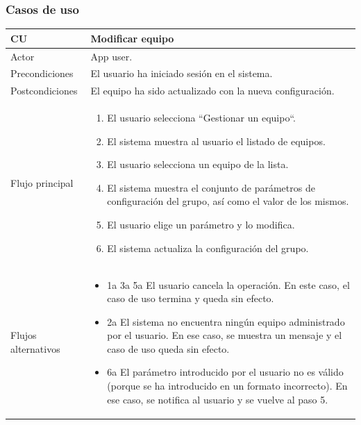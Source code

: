 \documentclass[twoside]{report}
\newcommand\addrow[2]{#1 &#2\\ }
\newcommand\addheading[2]{#1 &#2\\ \hline}
\newcommand\tabularhead{\begin{tabular}{lp{0.7\textwidth}}
\hline
}
\newenvironment{usecase}{\tabularhead}
{\hline\end{tabular}}
\begin{document}
\subsubsection{Casos de uso}



\begin{usecase}
  \addheading{\textbf{CU\arabic{usecase}}}{Modificar equipo} 
  \addrow{Actor}{App user.}
  \addrow{Precondiciones}{El usuario ha iniciado sesión en el sistema.}
  \addrow{Postcondiciones}{El equipo ha sido actualizado con la nueva configuración.}
  \addrow{Flujo principal}{
  		\begin{enumerate}
  		\item El usuario selecciona “Gestionar un equipo“. %
        \item El sistema muestra al usuario el listado de equipos. %
        \item El usuario selecciona un equipo de la lista. %
        \item El sistema muestra el conjunto de parámetros de configuración del grupo, así como el valor de los mismos. %
        \item El usuario elige un parámetro y lo modifica. %
        \item El sistema actualiza la configuración del grupo. %
  		\end{enumerate}
  }
  \addrow{Flujos alternativos}{
  		\begin{itemize}
  		\item 1a 3a 5a El usuario cancela la operación. En este caso, el caso de uso termina y queda sin efecto.
  		\item 2a El sistema no encuentra ningún equipo administrado por el usuario. En ese caso, se muestra un mensaje y el caso de uso queda sin efecto.
  		\item 6a El parámetro introducido por el usuario no es válido (porque se ha introducido en un formato incorrecto). En ese caso, se notifica al usuario y se vuelve al paso 5.
  		\end{itemize}
  }
\end{usecase}\\

\vspace{0.5cm}
\end{document}
